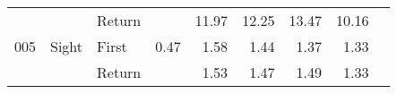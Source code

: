\begin{table}[!htb]
\begin{tabular}{lllrrrrrr}
    &       & Return &          &  11.97 &                                                 12.25 &                                                  13.47 &   10.16 \\
005 & Sight & First &     0.47 &   1.58 &                                                  1.44 &                                                   1.37 &    1.33 \\
    &       & Return &          &   1.53 &                                                  1.47 &                                                   1.49 &    1.33 \\
\bottomrule
\end{tabular}
\end{table}

